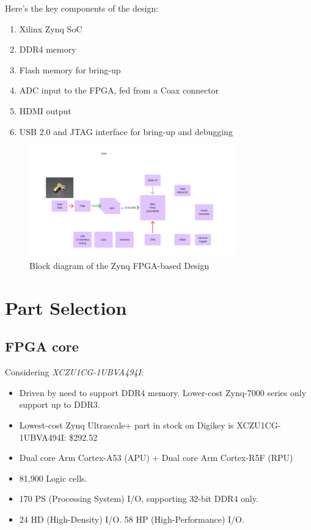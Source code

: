 \documentclass{article}
\begin{document}
Here's the key components of the design:
\begin{enumerate}
    \item Xilinx Zynq SoC
    \item DDR4 memory
    \item Flash memory for bring-up
    \item ADC input to the FPGA, fed from a Coax connector
    \item HDMI output
    \item USB 2.0 and JTAG interface for bring-up and debugging
\end{enumerate}

\begin{figure}
    \centering
    \includegraphics[width=0.8\textwidth]{../pics/block-diagram.png}
    \caption{Block diagram of the Zynq FPGA-based Design}
    \label{fig:fpga-block-diagram}
\end{figure}

\section{Part Selection}

\subsection{FPGA core}

Considering {\em XCZU1CG-1UBVA494I}:
\begin{itemize}
    \item Driven by need to support DDR4 memory. Lower-cost Zynq-7000 series only support up to DDR3.
    \item Lowest-cost Zynq Ultrascale+ part in stock on Digikey is XCZU1CG-1UBVA494I: \$292.52
    \item Dual core Arm Cortex-A53 (APU) + Dual core Arm Cortex-R5F (RPU)
    \item 81,900 Logic cells.
    \item 170 PS (Processing System) I/O, supporting 32-bit DDR4 only.
    \item 24 HD (High-Density) I/O. 58 HP (High-Performance) I/O.
\end{itemize}
\end{document}
